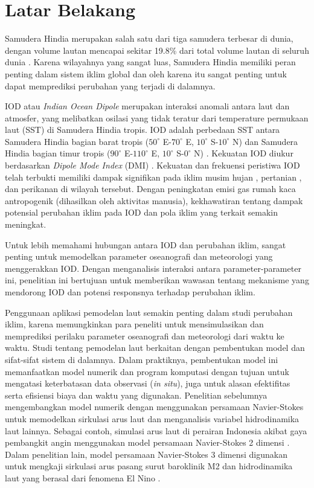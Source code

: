 \vspace{1.5pc}
\section[Latar Belakang]{Latar Belakang}
\begin{spacing}{1.5}
	Samudera Hindia merupakan salah satu dari tiga samudera terbesar di dunia, dengan volume lautan mencapai sekitar 19.8\% dari total volume lautan di seluruh dunia \cite{Eakins2010}. Karena wilayahnya yang sangat luas, Samudera Hindia memiliki peran penting dalam sistem iklim global dan oleh karena itu sangat penting untuk dapat memprediksi perubahan yang terjadi di dalamnya.
	
	IOD atau \textit{Indian Ocean Dipole} merupakan interaksi anomali antara laut dan atmosfer, yang melibatkan osilasi yang tidak teratur dari temperature permukaan laut (SST) di Samudera Hindia tropis. IOD adalah perbedaan SST antara Samudera Hindia bagian barat tropis ($50^\circ$ E-$70^\circ$ E, $10^\circ$ S-$10^\circ$ N) dan Samudera Hindia bagian timur tropis ($90^\circ$ E-$110^\circ$ E, $10^\circ$ S-$0^\circ$ N) \cite{Shunmugapandi2022,Thushara2020,Sattar2019}. Kekuatan IOD diukur berdasarkan \textit{Dipole Mode Index} (DMI) \cite{Saji1999}. Kekuatan dan frekuensi peristiwa IOD telah terbukti memiliki dampak signifikan pada iklim musim hujan \cite{Qiu2014}, pertanian \cite{Zhang2016}, dan perikanan \cite{Lan2013} di wilayah tersebut. Dengan peningkatan emisi gas rumah kaca antropogenik (dihasilkan oleh aktivitas manusia), kekhawatiran tentang dampak potensial perubahan iklim pada IOD dan pola iklim yang terkait semakin meningkat.
	
	Untuk lebih memahami hubungan antara IOD dan perubahan iklim, sangat penting untuk memodelkan parameter oseanografi dan meteorologi yang menggerakkan IOD. Dengan menganalisis interaksi antara parameter-parameter ini, penelitian ini bertujuan untuk memberikan wawasan tentang mekanisme yang mendorong IOD dan potensi responsnya terhadap perubahan iklim.
	
	Penggunaan aplikasi pemodelan laut semakin penting dalam studi perubahan iklim, karena memungkinkan para peneliti untuk mensimulasikan dan memprediksi perilaku parameter oseanografi dan meteorologi dari waktu ke waktu. Studi tentang pemodelan laut berkaitan dengan pembentukan model dan sifat-sifat sistem di dalamnya. Dalam praktiknya, pembentukan model ini memanfaatkan model numerik dan program komputasi dengan tujuan untuk mengatasi keterbatasan data observasi (\textit{in situ}), juga untuk alasan efektifitas serta efisiensi biaya dan waktu yang digunakan. Penelitian sebelumnya mengembangkan model numerik dengan menggunakan persamaan Navier-Stokes untuk memodelkan sirkulasi arus laut dan menganalisis variabel hidrodinamika laut lainnya. Sebagai contoh, simulasi arus laut di perairan Indonesia akibat gaya pembangkit angin menggunakan model persamaan Navier-Stokes 2 dimensi \cite{Rizal2018,Ikhwan2019,Haditiar2019}. Dalam penelitian lain, model persamaan Navier-Stokes 3 dimensi digunakan untuk mengkaji sirkulasi arus pasang surut baroklinik M2 dan hidrodinamika laut yang berasal dari fenomena El Nino \cite{Rizal2010,Haditiar2020,Ikhwan2021}.
	

\end{spacing}
